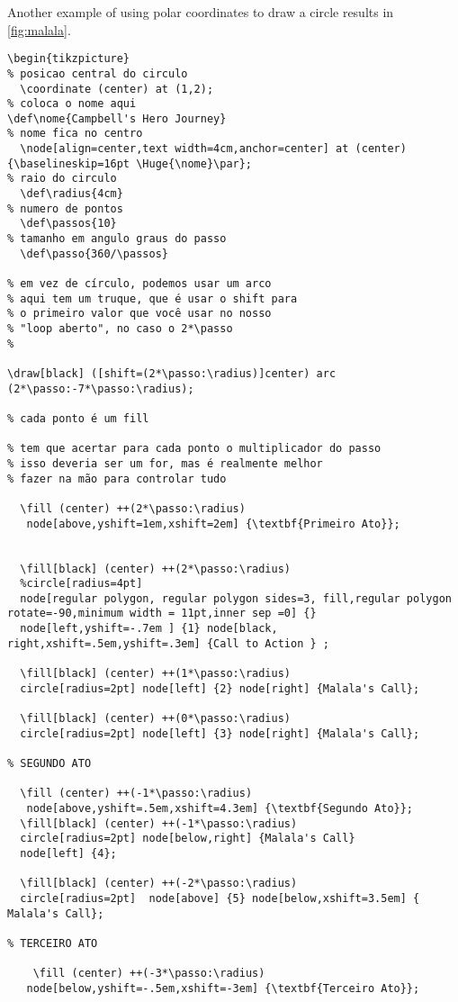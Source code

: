 Another example of using polar coordinates to draw a circle results in \autoref{fig:malala}.

\begin{verbatim}
\begin{tikzpicture}
% posicao central do circulo
  \coordinate (center) at (1,2);
% coloca o nome aqui
\def\nome{Campbell's Hero Journey}
% nome fica no centro
  \node[align=center,text width=4cm,anchor=center] at (center) {\baselineskip=16pt \Huge{\nome}\par};
% raio do circulo
  \def\radius{4cm}
% numero de pontos
  \def\passos{10}
% tamanho em angulo graus do passo
  \def\passo{360/\passos}

% em vez de círculo, podemos usar um arco
% aqui tem um truque, que é usar o shift para
% o primeiro valor que você usar no nosso
% "loop aberto", no caso o 2*\passo
%

\draw[black] ([shift=(2*\passo:\radius)]center) arc (2*\passo:-7*\passo:\radius);

% cada ponto é um fill

% tem que acertar para cada ponto o multiplicador do passo
% isso deveria ser um for, mas é realmente melhor
% fazer na mão para controlar tudo

  \fill (center) ++(2*\passo:\radius)
   node[above,yshift=1em,xshift=2em] {\textbf{Primeiro Ato}};


  \fill[black] (center) ++(2*\passo:\radius)
  %circle[radius=4pt]
  node[regular polygon, regular polygon sides=3, fill,regular polygon rotate=-90,minimum width = 11pt,inner sep =0] {}
  node[left,yshift=-.7em ] {1} node[black, right,xshift=.5em,yshift=.3em] {Call to Action } ;

  \fill[black] (center) ++(1*\passo:\radius)
  circle[radius=2pt] node[left] {2} node[right] {Malala's Call};

  \fill[black] (center) ++(0*\passo:\radius)
  circle[radius=2pt] node[left] {3} node[right] {Malala's Call};

% SEGUNDO ATO

  \fill (center) ++(-1*\passo:\radius)
   node[above,yshift=.5em,xshift=4.3em] {\textbf{Segundo Ato}};
  \fill[black] (center) ++(-1*\passo:\radius)
  circle[radius=2pt] node[below,right] {Malala's Call}
  node[left] {4};

  \fill[black] (center) ++(-2*\passo:\radius)
  circle[radius=2pt]  node[above] {5} node[below,xshift=3.5em] { Malala's Call};

% TERCEIRO ATO

    \fill (center) ++(-3*\passo:\radius)
   node[below,yshift=-.5em,xshift=-3em] {\textbf{Terceiro Ato}};


\end{verbatim}

